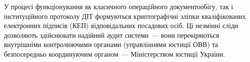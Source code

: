 У процесі функціонування як класичного операційного документообігу, так і інституційного протоколу ДІТ формуються криптографічні зліпки кваліфікованих електронних підписів (КЕП) відповідальних посадових осіб. Ці незмінні сліди дозволяють здійснювати надійний аудит системи~--- вони перевіряються внутрішніми контролюючими органами (управліннями юстиції ОВВ) та безпосередньо координуючим органом~--- Міністерством юстиції України.
